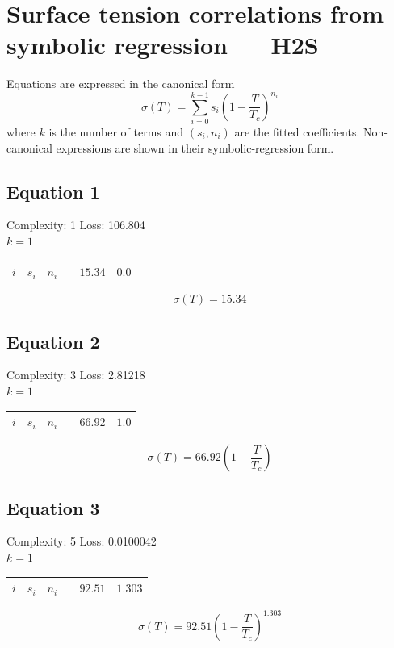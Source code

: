 \documentclass[11pt]{article}
\begin{document}
\section*{Surface tension correlations from symbolic regression — H2S}
\noindent Equations are expressed in the canonical form
\[
  \sigma(T) = \sum_{i=0}^{k-1} s_i \left(1 - \frac{T}{T_c}\right)^{\!n_i}
\]
where $k$ is the number of terms and $(s_i, n_i)$ are the fitted coefficients.
Non-canonical expressions are shown in their symbolic-regression form.

\subsection*{Equation 1}
\noindent Complexity: 1 \quad Loss: 106.804 \\[4pt]
\noindent $k = 1$ \\[2pt]
\begin{center}
\begin{tabular}{ccc}
\toprule
$i$ & $s_i$ & $n_i$ \
 & $15.34$ & $0.0$ \\
\bottomrule
\end{tabular}
\end{center}
\[
\sigma(T) = 15.34
\]

\subsection*{Equation 2}
\noindent Complexity: 3 \quad Loss: 2.81218 \\[4pt]
\noindent $k = 1$ \\[2pt]
\begin{center}
\begin{tabular}{ccc}
\toprule
$i$ & $s_i$ & $n_i$ \
 & $66.92$ & $1.0$ \\
\bottomrule
\end{tabular}
\end{center}
\[
\sigma(T) = 66.92 \left(1 - \dfrac{T}{T_{\!c}}\right)
\]

\subsection*{Equation 3}
\noindent Complexity: 5 \quad Loss: 0.0100042 \\[4pt]
\noindent $k = 1$ \\[2pt]
\begin{center}
\begin{tabular}{ccc}
\toprule
$i$ & $s_i$ & $n_i$ \
 & $92.51$ & $1.303$ \\
\bottomrule
\end{tabular}
\end{center}
\[
\sigma(T) = 92.51 \left(1 - \dfrac{T}{T_{\!c}}\right)^{1.303}
\]
\end{document}
